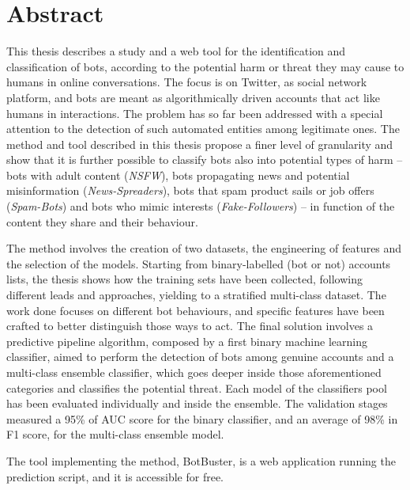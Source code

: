 
\newpage
\chapter*{Abstract}


This thesis describes a study and a web tool for the identification and classification of bots, according to the potential harm or threat they may cause to humans in online conversations. The focus is on Twitter, as social network platform, and bots are meant as algorithmically driven accounts that act like humans in interactions.
The problem has so far been addressed with a special attention to the detection of such automated entities among legitimate ones. The method and tool described in this thesis propose a finer level of granularity and show that it is further possible to classify bots also into potential types of harm --  bots with adult content (\textit{NSFW}), bots propagating news and potential misinformation (\textit{News-Spreaders}), bots that spam product sails or job offers (\textit{Spam-Bots}) and bots who mimic interests (\textit{Fake-Followers}) -- in function of the content they share and their behaviour.

The method involves the creation of two datasets, the engineering of features and the selection of the models.
Starting from binary-labelled (bot or not) accounts lists, the thesis shows how the training sets have been collected, following different leads and approaches, yielding to a stratified multi-class dataset.
The work done focuses on different bot behaviours, and specific features have been crafted to better distinguish those ways to act.
The final solution involves a predictive pipeline algorithm, composed by a first binary machine learning classifier, aimed to perform the detection of bots among genuine accounts and a multi-class ensemble classifier, which goes deeper inside those aforementioned categories and classifies the potential threat.
Each model of the classifiers pool has been evaluated individually and inside the ensemble. The validation stages measured a 95\% of AUC score for the binary classifier, and an average of 98\% in F1 score, for the multi-class ensemble model.

The tool implementing the method, BotBuster, is a web application running the prediction script, and it is accessible for free.



